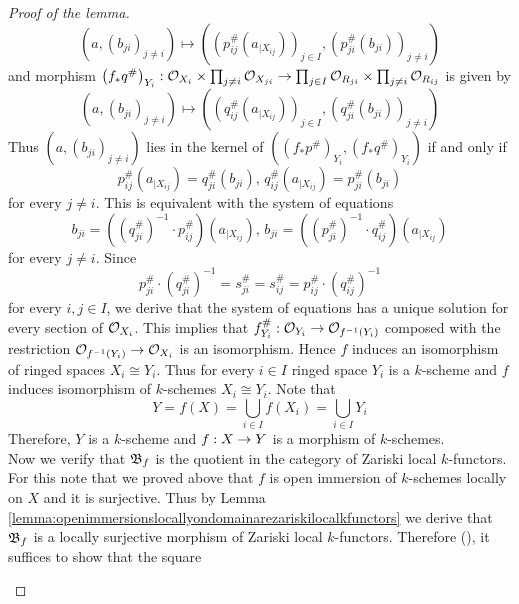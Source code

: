 \begin{proof}[Proof of the lemma]
$$\left(a, (b_{ji})_{j\neq i}\right)  \mapsto \left(\left(p_{ij}^{\#}(a_{\mid X_{ij}})\right)_{j\in I}, \left(p_{ji}^{\#}(b_{ji})\right)_{j\neq i}\right) $$
and morphism $\left(f_*q^{\#}\right)_{Y_i}:{\mathcal O}_{X_i}\times \prod_{j\neq i}{\mathcal O}_{X_{ji}} \rightarrow \prod_{j\in I}{\mathcal O}_{R_{ji}} \times  \prod_{j\neq i}{\mathcal O}_{R_{ij}}$ is given by
$$\left(a, (b_{ji})_{j\neq i}\right)  \mapsto \left(\left(q_{ij}^{\#}(a_{\mid X_{ij}})\right)_{j\in I}, \left(q_{ji}^{\#}(b_{ji})\right)_{j\neq i}\right)$$
Thus $\left(a, (b_{ji})_{j\neq i}\right)$ lies in the kernel of $\left(\left(f_*p^{\#}\right)_{Y_i}, \left(f_*q^{\#}\right)_{Y_i}\right)$ if and only if
$$p_{ij}^{\#}(a_{\mid X_{ij}}) = q_{ji}^{\#}(b_{ji}),\,q_{ij}^{\#}(a_{\mid X_{ij}}) = p_{ji}^{\#}(b_{ji})$$
for every $j\neq i$. This is equivalent with the system of equations
$$b_{ji} = \left(\left(q_{ji}^{\#}\right)^{-1}\cdot p_{ij}^{\#}\right)(a_{\mid X_{ij}}),\,b_{ji} = \left(\left(p_{ji}^{\#}\right)^{-1}\cdot q_{ij}^{\#}\right)(a_{\mid X_{ij}})$$
for every $j\neq i$. Since
$$p_{ji}^{\#}\cdot \left(q^{\#}_{ji}\right)^{-1} = s^{\#}_{ji} = s^{\#}_{ij} = p^{\#}_{ij}\cdot \left(q_{ij}^{\#}\right)^{-1}$$
for every $i,j\in I$, we derive that the system of equations has a unique solution for every section of ${\mathcal O}_{X_i}$. This implies that $f^{\#}_{Y_i}:{\mathcal O}_{Y_i}\rightarrow {\mathcal O}_{f^{-1}(Y_i)}$ composed with the restriction ${\mathcal O}_{f^{-1}(Y_i)}\rightarrow {\mathcal O}_{X_i}$ is an isomorphism. Hence $f$ induces an isomorphism of ringed spaces $X_i\cong Y_i$. Thus for every $i\in I$ ringed space $Y_i$ is a $k$-scheme and $f$ induces isomorphism of $k$-schemes $X_i\cong Y_i$. Note that
$$Y = f(X) = \bigcup_{i\in I}f(X_i) = \bigcup_{i\in I}Y_i$$
Therefore, $Y$ is a $k$-scheme and $f:X\rightarrow Y$ is a morphism of $k$-schemes.\\
Now we verify that ${\mathfrak B}_f$ is the quotient in the category of Zariski local $k$-functors. For this note that we proved above that $f$ is open immersion of $k$-schemes locally on $X$ and it is surjective. Thus by Lemma \ref{lemma:openimmersionslocallyondomainarezariskilocalkfunctors} we derive that ${\mathfrak B}_f$ is a locally surjective morphism of Zariski local $k$-functors. Therefore ({\cite[Theorem 7.3]{Sheaves}}), it suffices to show that the square
\begin{center}
\end{center}
\end{proof}
